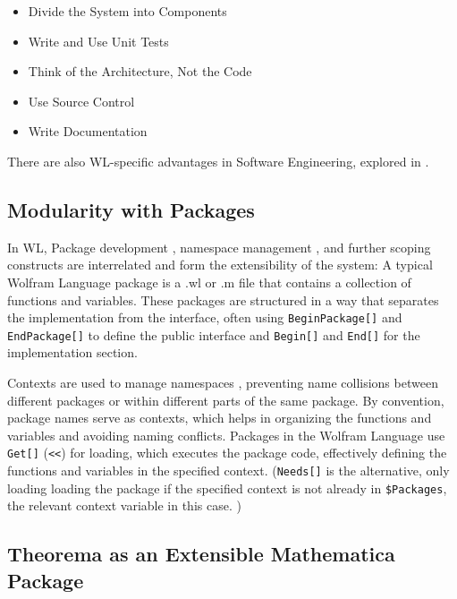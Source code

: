 \begin{itemize}
    \item Divide the System into Components
    \item Write and Use Unit Tests
    \item Think of the Architecture, Not the Code
    \item Use Source Control
    \item Write Documentation
\end{itemize}

There are also WL-specific advantages in Software Engineering, explored in \cite[Take Advantage of the Wolfram Language]{noauthor_building_nodate}.

\subsection{Modularity with Packages} \label{modularity}

In WL, Package development \cite{noauthor_package_nodate}, namespace management \cite{noauthor_namespace_nodate}, and further scoping constructs \cite{noauthor_scoping_nodate} are interrelated and form the extensibility of the system: A typical Wolfram Language package is a .wl or .m file that contains a collection of functions and variables. These packages are structured in a way that separates the implementation from the interface, often using \lstinline+BeginPackage[]+ \cite{noauthor_endpackagewolfram_nodate} and \lstinline+EndPackage[]+ \cite{noauthor_endpackagewolfram_nodate} to define the public interface and \lstinline+Begin[]+ \cite{noauthor_beginwolfram_nodate} and \lstinline+End[]+ \cite{noauthor_endwolfram_nodate} for the implementation section.

Contexts are used to manage namespaces \cite{noauthor_namespace_nodate} , preventing name collisions between different packages or within different parts of the same package. By convention, package names serve as contexts, which helps in organizing the functions and variables and avoiding naming conflicts. Packages in the Wolfram Language use \lstinline+Get[]+ (\lstinline+<<+) \cite{noauthor_getwolfram_nodate} for loading, which executes the package code, effectively defining the functions and variables in the specified context. (\lstinline+Needs[]+ is the alternative, only loading loading the package if the specified context is not already in \lstinline+$Packages+, the relevant context variable in this case. \cite{noauthor_needswolfram_nodate})

\subsection{Theorema as an Extensible Mathematica Package} \label{extensible-package}

